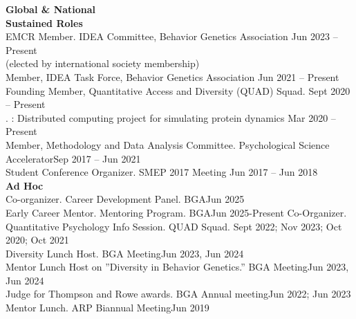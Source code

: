 {\large \textbf{Global \& National}}\\
\textrm{\textbf{Sustained Roles}}\\
EMCR Member. IDEA Committee, Behavior Genetics Association \hfill{Jun 2023 – Present}\\ %
\hspace*{25pt}(elected by international society membership)\\ 
Member, IDEA Task Force, Behavior Genetics Association \hfill{Jun 2021 – Present}\\
Founding Member, Quantitative Access and Diversity (QUAD) Squad. \hfill{Sept 2020 – Present}\\%
. : Distributed computing project for simulating protein dynamics \hfill{Mar 2020 – Present}\\
Member, Methodology and Data Analysis Committee. Psychological Science Accelerator\hfill{Sep 2017 – Jun 2021}\\
Student Conference Organizer. SMEP 2017 Meeting \hfill{Jun 2017 – Jun 2018}\medskip\\
\textrm{\textbf{Ad Hoc}}\\
Co-organizer. Career Development Panel. BGA\hfill{Jun 2025}\\
Early Career Mentor. Mentoring Program. BGA\hfill{Jun 2025-Present}\newline
Co-Organizer. Quantitative Psychology Info Session. QUAD Squad. \hfill{Sept 2022; Nov 2023;}\newline
\hspace*{0pt}\hfill{Oct 2020; Oct 2021}\\
Diversity Lunch Host. BGA Meeting\hfill{Jun 2023, Jun 2024}\\%
Mentor Lunch Host on ''Diversity in Behavior Genetics.'' BGA Meeting\hfill{Jun 2023, Jun 2024}\\
Judge for Thompson and Rowe awards. BGA Annual meeting\hfill{Jun 2022; Jun 2023}\\
Mentor Lunch. ARP Biannual Meeting\hfill{Jun 2019}\\
